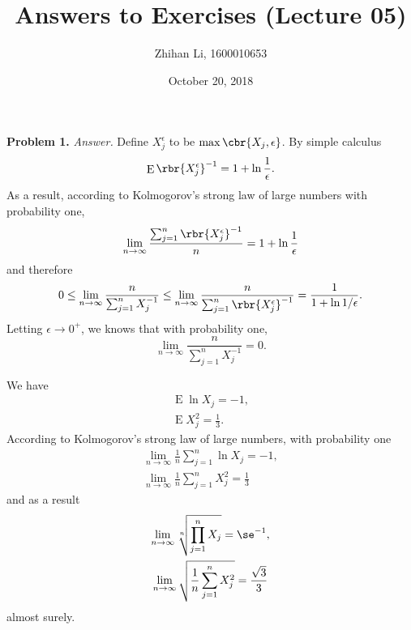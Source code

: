 \documentclass[english, nochinese]{pnote}
\title{Answers to Exercises (Lecture 05)}
\author{Zhihan Li, 1600010653}
\date{October 20, 2018}
\DeclareMathOperator\ope{\mathrm{E}}
\begin{document}
\maketitle

\textbf{Problem 1.} \textit{Answer.} Define $X_j^{\epsilon}$ to be $ \max \cbr{ X_j, \epsilon } $. By simple calculus
\begin{equation}
\ope \rbr{X_j^{ \epsilon}}^{-1} = 1 + \ln \frac{1}{\epsilon}.
\end{equation}
As a result, according to Kolmogorov's strong law of large numbers with probability one,
\begin{equation}
\lim_{ n \rightarrow \infty } \frac{ \sum_{ j = 1 }^n \rbr{X_j^{ \epsilon}}^{-1} }{n} = 1 + \ln \frac{1}{\epsilon}
\end{equation}
and therefore
\begin{equation*}
0 \le \lim_{ n \rightarrow \infty } \frac{n}{ \sum_{ j = 1 }^n X_j^{-1} } \le \lim_{ n \rightarrow \infty } \frac{n}{ \sum_{ j = 1 }^n \rbr{X_j^{ \epsilon}}^{-1} } = \frac{1}{ 1 + \ln 1 / \epsilon }.
\end{equation*}
Letting $ \epsilon \rightarrow 0^+ $, we knows that with probability one,
\begin{equation}
\lim_{ n \rightarrow \infty } \frac{n}{ \sum_{ j = 1 }^n X_j^{-1} } = 0.
\end{equation}

We have
\begin{gather}
\ope \ln X_j = -1, \\
\ope X_j^2 = \frac{1}{3}.
\end{gather}
According to Kolmogorov's strong law of large numbers, with probability one
\begin{gather}
\lim_{ n \rightarrow \infty } \frac{1}{n} \sum_{ j = 1 }^n \ln X_j = -1, \\
\lim_{ n \rightarrow \infty } \frac{1}{n} \sum_{ j = 1 }^n X_j^2 = \frac{1}{3}
\end{gather}
and as a result
\begin{gather}
\lim_{ n \rightarrow \infty } \sqrt[n]{ \prod_{ j = 1 }^n X_j } = \se^{-1}, \\
\lim_{ n \rightarrow \infty } \sqrt{ \frac{1}{n} \sum_{ j = 1 }^n X_j^2 } = \frac{\sqrt{3}}{3}
\end{gather}
almost surely.
\end{document}

